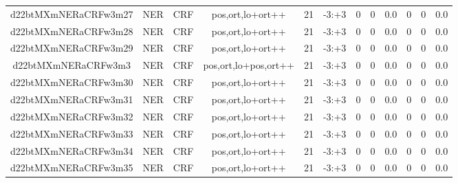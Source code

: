 \documentclass[a4paper]{article}
\begin{document}
\begin{landscape}
\begin{center}
\begin{tabular}{ |c|c|c|c|c|c|c|c|c|c|c|c|}
 
 	
 	\small{ d22btMXmNERaCRFw3m27 } & \small{ NER} & \small{  CRF }  & pos,ort,lo+ort++  &  21 &  \small{  -3:+3 }  &  0 & 0 & 0.0  &  0 & 0 & 0.0 \\
 	

 
 	
 	\small{ d22btMXmNERaCRFw3m28 } & \small{ NER} & \small{  CRF }  & pos,ort,lo+ort++  &  21 &  \small{  -3:+3 }  &  0 & 0 & 0.0  &  0 & 0 & 0.0 \\
 	

 
 	
 	\small{ d22btMXmNERaCRFw3m29 } & \small{ NER} & \small{  CRF }  & pos,ort,lo+ort++  &  21 &  \small{  -3:+3 }  &  0 & 0 & 0.0  &  0 & 0 & 0.0 \\
 	

 
 	
 	\small{ d22btMXmNERaCRFw3m3 } & \small{ NER} & \small{  CRF }  & pos,ort,lo+pos,ort++  &  21 &  \small{  -3:+3 }  &  0 & 0 & 0.0  &  0 & 0 & 0.0 \\
 	

 
 	
 	\small{ d22btMXmNERaCRFw3m30 } & \small{ NER} & \small{  CRF }  & pos,ort,lo+ort++  &  21 &  \small{  -3:+3 }  &  0 & 0 & 0.0  &  0 & 0 & 0.0 \\
 	

 
 	
 	\small{ d22btMXmNERaCRFw3m31 } & \small{ NER} & \small{  CRF }  & pos,ort,lo+ort++  &  21 &  \small{  -3:+3 }  &  0 & 0 & 0.0  &  0 & 0 & 0.0 \\
 	

 
 	
 	\small{ d22btMXmNERaCRFw3m32 } & \small{ NER} & \small{  CRF }  & pos,ort,lo+ort++  &  21 &  \small{  -3:+3 }  &  0 & 0 & 0.0  &  0 & 0 & 0.0 \\
 	

 
 	
 	\small{ d22btMXmNERaCRFw3m33 } & \small{ NER} & \small{  CRF }  & pos,ort,lo+ort++  &  21 &  \small{  -3:+3 }  &  0 & 0 & 0.0  &  0 & 0 & 0.0 \\
 	

 
 	
 	\small{ d22btMXmNERaCRFw3m34 } & \small{ NER} & \small{  CRF }  & pos,ort,lo+ort++  &  21 &  \small{  -3:+3 }  &  0 & 0 & 0.0  &  0 & 0 & 0.0 \\
 	

 
 	
 	\small{ d22btMXmNERaCRFw3m35 } & \small{ NER} & \small{  CRF }  & pos,ort,lo+ort++  &  21 &  \small{  -3:+3 }  &  0 & 0 & 0.0  &  0 & 0 & 0.0 \\
 	


\end{tabular}
\end{center}
\end{landscape}
\end{document}
